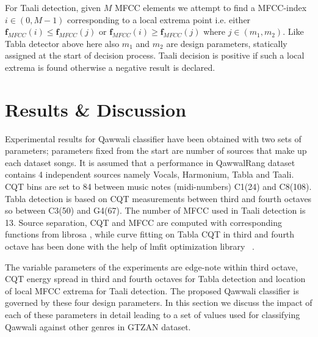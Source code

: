 \documentclass{article}
\begin{document}
For Taali detection, given $M$ MFCC elements we attempt to find a MFCC-index $i \in (0, M-1)$ corresponding to a local extrema point i.e. either $\boldsymbol{f}_{MFCC}(i) \leq \boldsymbol{f}_{MFCC}(j)$ or $\boldsymbol{f}_{MFCC}(i) \geq \boldsymbol{f}_{MFCC}(j)$ where $j \in (m_{1}, m_{2})$. Like Tabla detector above here also $m_{1}$ and $m_{2}$ are design parameters, statically assigned at the start of decision process. Taali decision is positive if such a local extrema is found otherwise a negative result is declared.

\section{Results \& Discussion}\label{sec:result}
Experimental results for Qawwali classifier have been obtained with two sets of parameters; parameters fixed from the start are number of sources that make up each dataset songs. It is assumed that a performance in QawwalRang dataset contains 4 independent sources namely Vocals, Harmonium, Tabla and Taali. CQT bins are set to 84 between music notes (midi-numbers) C1(24) and C8(108). Tabla detection is based on CQT measurements between third and fourth octaves so between C3(50) and G4(67). The number of MFCC used in Taali detection is 13. Source separation, CQT and MFCC are computed with corresponding functions from librosa \citep{brian_mcfee_2022_6097378}, while curve fitting on Tabla CQT in third and fourth octave has been done with the help of lmfit optimization library ~\citep{newville_matthew_2014}.

The variable parameters of the experiments are edge-note within third octave, CQT energy spread in third and fourth octaves for Tabla detection and location of local MFCC extrema for Taali detection. The proposed Qawwali classifier is governed by these four design parameters. In this section we discuss the impact of each of these parameters in detail leading to a set of values used for classifying Qawwali against other genres in GTZAN dataset.
\end{document}

